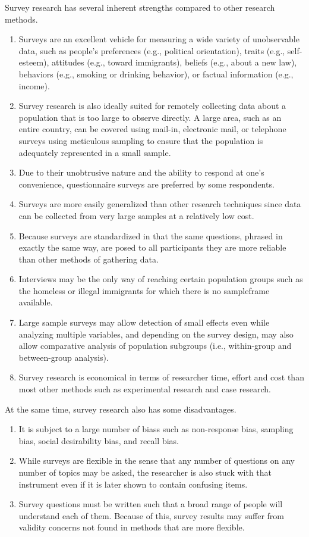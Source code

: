 Survey research has several inherent strengths compared to other research methods. 

\begin{enumerate}
	\item Surveys are an excellent vehicle for measuring a wide variety of unobservable data, such as people's preferences (e.g., political orientation), traits (e.g., self-esteem), attitudes (e.g., toward immigrants), beliefs (e.g., about a new law), behaviors (e.g., smoking or drinking behavior), or factual information (e.g., income). 
	\item Survey research is also ideally suited for remotely collecting data about a population that is too large to observe directly. A large area, such as an entire country, can be covered using mail-in, electronic mail, or telephone surveys using meticulous sampling to ensure that the population is adequately represented in a small sample. 
	\item Due to their unobtrusive nature and the ability to respond at one's convenience, questionnaire surveys are preferred by some respondents.
	\item Surveys are more easily generalized than other research techniques since data can be collected from very large samples at a relatively low cost.
	\item Because surveys are standardized in that the same questions, phrased in exactly the same way, are posed to all participants they are more reliable than other methods of gathering data.
	\item Interviews may be the only way of reaching certain population groups such as the homeless or illegal immigrants for which there is no \gls{sampleframe} available. 
	\item Large sample surveys may allow detection of small effects even while analyzing multiple variables, and depending on the survey design, may also allow comparative analysis of population subgroups (i.e., within-group and between-group analysis). 
	\item Survey research is economical in terms of researcher time, effort and cost than most other methods such as experimental research and case research.
\end{enumerate}

At the same time, survey research also has some disadvantages. 

\begin{enumerate}
	\item It is subject to a large number of \glspl{bias} such as non-response bias, sampling bias, social desirability bias, and recall bias.
	\item While surveys are flexible in the sense that any number of questions on any number of topics may be asked, the researcher is also stuck with that instrument even if it is later shown to contain confusing items. 
	\item Survey questions must be written such that a broad range of people will understand each of them. Because of this, survey results may suffer from validity concerns not found in methods that are more flexible. 
\end{enumerate}


